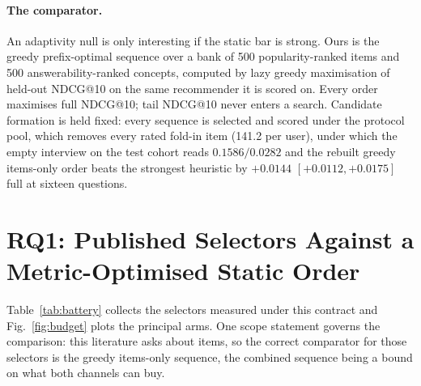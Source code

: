 \documentclass[runningheads]{llncs}
\begin{document}
\paragraph{The comparator.}
An adaptivity null is only interesting if the static bar is strong. Ours is the greedy
prefix-optimal sequence over a bank of 500 popularity-ranked items and 500 answerability-ranked
concepts, computed by lazy greedy maximisation of held-out NDCG@10 on the same recommender it is
scored on. Every order maximises full NDCG@10; tail NDCG@10 never enters a search. Candidate formation is held fixed: every sequence is
selected and scored under the protocol pool, which removes every rated fold-in item (141.2 per user),
under which the empty interview on the test cohort reads $0.1586/0.0282$ and the rebuilt greedy
items-only order beats the strongest heuristic by $+0.0144$ $[+0.0112,+0.0175]$ full at sixteen
questions.

\section{RQ1: Published Selectors Against a Metric-Optimised Static Order}
\label{sec:rq1}

Table~\ref{tab:battery} collects the selectors measured under this contract and
Fig.~\ref{fig:budget} plots the principal arms. One scope statement governs the comparison: this
literature asks about items, so the correct comparator for those selectors is the greedy items-only
sequence, the combined sequence being a bound on what both channels can buy.
\end{document}
